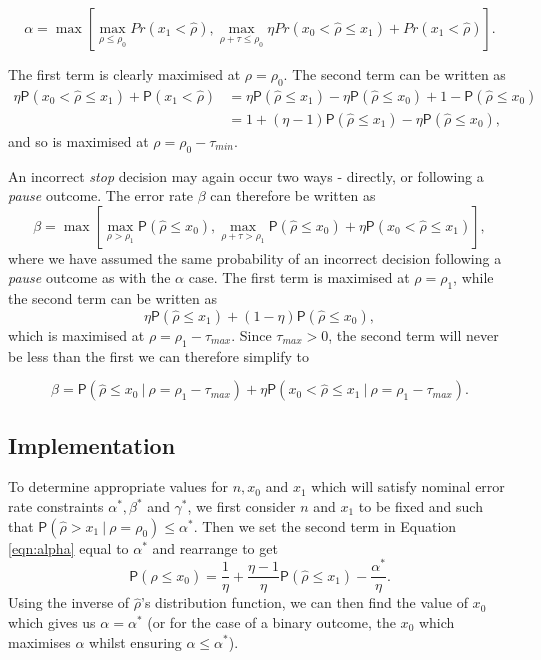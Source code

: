 \documentclass{bmcart}
\newcommand{\PR}{{\mathsf P}}
\begin{document}
\begin{equation}\label{eqn:alpha}
\alpha = \max \left[ \max_{\rho \leq \rho_0} Pr(x_1 < \hat{\rho}), \max_{\rho + \tau \leq \rho_0} \eta Pr(x_0 < \hat{\rho} \leq x_1) + Pr(x_1 < \hat{\rho}) \right].
\end{equation}

The first term is clearly maximised at $\rho = \rho_0$. The second term can be written as
$$
\begin{aligned}
\eta \PR(x_0 < \hat{\rho} \leq x_1) + \PR(x_1 < \hat{\rho}) &=
\eta \PR(\hat{\rho} \leq x_1) - \eta \PR(\hat{\rho} \leq x_0) + 1 - \PR(\hat{\rho} \leq x_0)\\
&= 1 + (\eta - 1)\PR(\hat{\rho} \leq x_1) - \eta \PR(\hat{\rho} \leq x_0),
\end{aligned}
$$
and so is maximised at $\rho = \rho_0 - \tau_{min}$.

An incorrect \emph{stop} decision may again occur two ways - directly, or following a \emph{pause} outcome. The error rate $\beta$ can therefore be written as
$$
\beta = \max \left[ \max_{\rho > \rho_1} \PR(\hat{\rho} \leq x_0), \max_{\rho + \tau > \rho_1} \PR(\hat{\rho} \leq x_0) + \eta \PR(x_0 < \hat{\rho} \leq x_1) \right],
$$
where we have assumed the same probability of an incorrect decision following a \emph{pause} outcome as with the $\alpha$ case. The first term is maximised at $\rho = \rho_1$, while the second term can be written as
$$
\eta \PR(\hat{\rho} \leq x_1) + (1 - \eta) \PR(\hat{\rho} \leq x_0),
$$
which is maximised at $\rho = \rho_1 - \tau_{max}$. Since $\tau_{max} > 0$, the second term will never be less than the first we can therefore simplify to

\begin{equation}\label{eqn:beta}
\beta = \PR(\hat{\rho} \leq x_0 ~|~ \rho = \rho_1 - \tau_{max}) + \eta \PR(x_0 < \hat{\rho} \leq x_1 ~|~ \rho = \rho_1 - \tau_{max}).
\end{equation}

\subsection{Implementation}

To determine appropriate values for $n, x_0$ and $x_1$ which will satisfy nominal error rate constraints $\alpha^*, \beta^*$ and $\gamma^*$, we first consider $n$ and $x_1$ to be fixed and such that $\PR(\hat{\rho} > x_1 ~|~ \rho = \rho_0) \leq \alpha^*$. Then we set the second term in Equation \ref{eqn:alpha} equal to $\alpha^*$ and rearrange to get
$$
\PR(\hat{\rho} \leq x_0) = \frac{1}{\eta} + \frac{\eta - 1}{\eta}\PR(\hat{\rho} \leq x_1) - \frac{\alpha^*}{\eta}.
$$
Using the inverse of $\hat{\rho}$'s distribution function, we can then find the value of $x_0$ which gives us $\alpha = \alpha^*$ (or for the case of a binary outcome, the $x_0$ which maximises $\alpha$ whilst ensuring $\alpha \leq \alpha^*$).
\end{document}
